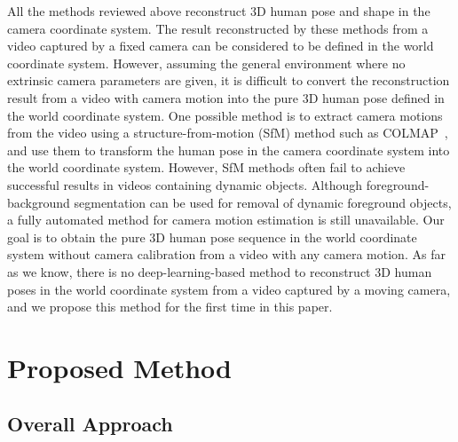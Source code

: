 \documentclass[10pt,twocolumn,letterpaper]{article}
\begin{document}
All the methods reviewed above reconstruct 3D human pose and shape in the camera coordinate system. The result reconstructed by these methods from a video captured by a fixed camera can be considered to be defined in the world coordinate system. However, assuming the general environment where no extrinsic camera parameters are given, it is difficult to convert the reconstruction result from a video with camera motion into the pure 3D human pose defined in the world coordinate system. One possible method is to extract camera motions from the video using a structure-from-motion (SfM) method such as COLMAP~\cite{schonberger2016structure}, and use them to transform the human pose in the camera coordinate system into the world coordinate system. However, SfM methods often fail to achieve successful results in videos containing dynamic objects. Although foreground-background segmentation can be used for removal of dynamic foreground objects, a fully automated method for camera motion estimation is still unavailable. Our goal is to obtain the pure 3D human pose sequence in the world coordinate system without camera calibration from a video with any camera motion. As far as we know, there is no deep-learning-based method to reconstruct 3D human poses in the world coordinate system from a video captured by a moving camera, and we propose this method for the first time in this paper.




\section{Proposed Method}

\subsection{Overall Approach}
\end{document}
